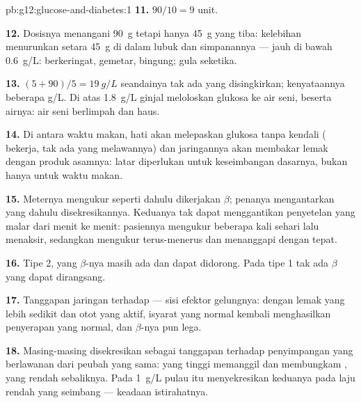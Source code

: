 \begin{solution}{pb:g12:glucose-and-diabetes:1}
\textbf{11.} $90/10 = 9$ unit.

\textbf{12.} Dosisnya menangani \qty{90}{g} tetapi hanya \qty{45}{g}
yang tiba: kelebihan  menurunkan  setara \qty{45}{g}
di dalam lubuk dan simpanannya --- jauh di bawah \qty{0.6}{g/L}:
berkeringat, gemetar, bingung; gula seketika.

\textbf{13.} $(5 + 90)/5 = \qty{19}{g/L}$ seandainya tak ada yang
disingkirkan; kenyataannya beberapa \unit{g/L}. Di atas \qty{1.8}{g/L}
ginjal meloloskan glukosa ke air seni, beserta airnya: air seni
berlimpah dan haus.

\textbf{14.} Di antara waktu makan, hati akan melepaskan glukosa tanpa
kendali ( bekerja, tak ada yang melawannya) dan jaringannya
akan membakar lemak dengan produk asamnya: latar  diperlukan
untuk keseimbangan dasarnya, bukan hanya untuk waktu makan.

\textbf{15.} Meternya mengukur  seperti dahulu dikerjakan 
$\beta$; penanya mengantarkan  yang dahulu disekresikannya.
Keduanya tak dapat menggantikan penyetelan yang malar dari menit ke
menit: pasiennya mengukur beberapa kali sehari lalu menaksir, sedangkan
 mengukur terus-menerus dan menanggapi dengan tepat.

\textbf{16.} Tipe 2, yang  $\beta$-nya masih ada dan dapat didorong.
Pada tipe 1 tak ada  $\beta$ yang dapat dirangsang.

\textbf{17.} Tanggapan jaringan terhadap  --- sisi efektor
gelungnya: dengan lemak yang lebih sedikit dan otot yang aktif,
isyarat  yang normal kembali menghasilkan penyerapan yang
normal, dan  $\beta$-nya pun lega.

\textbf{18.} Masing-masing disekresikan sebagai tanggapan terhadap
penyimpangan yang berlawanan dari peubah yang sama:  yang
tinggi memanggil  dan membungkam , yang rendah
sebaliknya. Pada \qty{1}{g/L} pulau itu menyekresikan keduanya pada
laju rendah yang seimbang --- keadaan istirahatnya.


\end{solution}
